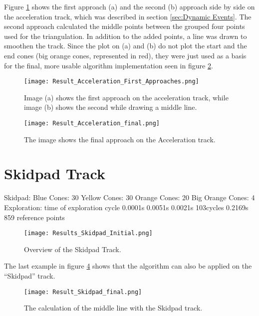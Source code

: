 Figure \ref{fig:Result Acceleration First Approaches} shows the first approach (a) and the second (b) approach side by side on the acceleration track, which was described in section \ref{sec:Dynamic Events}. The second approach calculated the middle points between the grouped four points used for the triangulation. In addition to the added points, a line was drawn to smoothen the track. Since the plot on (a) and (b) do not plot the start and the end cones (big orange cones, represented in red), they were just used as a basis for the final, more usable algorithm implementation seen in figure \ref{fig:Result Acceleration Final}.
\begin{figure}[H]
    \centering
    \texttt{[image: Result\_Acceleration\_First\_Approaches.png]}
    \caption{Image (a) shows the first approach on the acceleration track, while image (b) shows the second while drawing a middle line.}
    \label{fig:Result Acceleration First Approaches}
\end{figure}
\begin{figure}[H]
    \centering
    \texttt{[image: Result\_Acceleration\_final.png]}
    \caption{The image shows the final approach on the Acceleration track.}
    \label{fig:Result Acceleration Final}
\end{figure}

\section{Skidpad Track} \label{sec:Results Skidpad Track}
Skidpad:
Blue Cones: 30
Yellow Cones: 30
Orange Cones: 20
Big Orange Cones: 4
Exploration:
time of exploration cycle
0.0001s 0.0051s 0.0021s 103cycles 0.2169s
859 reference points

\begin{figure}[H]
    \centering
    \texttt{[image: Results\_Skidpad\_Initial.png]}
    \caption{Overview of the Skidpad Track.}
    \label{fig:Results Skidpad Initial}
\end{figure}

The last example in figure \ref{fig:Result Skidpad Final} shows that the algorithm can also be applied on the ``Skidpad'' track.
\begin{figure}[H]
    \centering
    \texttt{[image: Result\_Skidpad\_final.png]}
    \caption{The calculation of the middle line with the Skidpad track.}
    \label{fig:Result Skidpad Final}
\end{figure}

